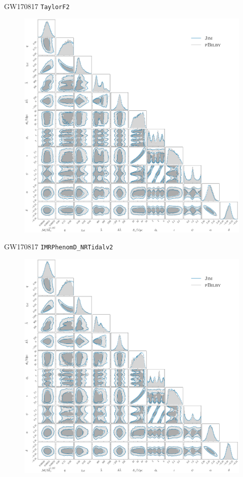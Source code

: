 \documentclass[usenames,dvipsnames,t]{beamer}
\begin{document}
\begin{frame}{GW170817 \texttt{TaylorF2}}
  \vspace{-4.5mm}
  \begin{figure}
    \centering
    \includegraphics[scale = 0.132]{Figures/GW170817_TaylorF2.pdf}
  \end{figure}
\end{frame}

\begin{frame}{GW170817 \texttt{IMRPhenomD\_NRTidalv2}}
  \vspace{-4.5mm}
  \begin{figure}
    \centering
    \includegraphics[scale = 0.132]{Figures/GW170817_NRTidalv2.pdf}
  \end{figure}
\end{frame}
\end{document}
